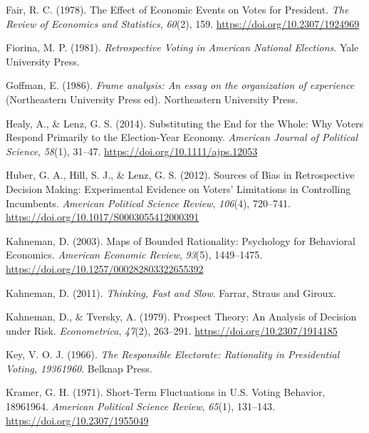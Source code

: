 \documentclass[
]{article}
\newlength{\cslhangindent}
\newlength{\cslentryspacingunit} %
\newenvironment{CSLReferences}[2] %
 {%
  \setlength{\parindent}{0pt}
  \ifodd #1
  \let\oldpar\par
  \def\par{\hangindent=\cslhangindent\oldpar}
  \fi
  \setlength{\parskip}{#2\cslentryspacingunit}
 }%
 {}
\begin{document}
\begin{CSLReferences}{1}{0}
\leavevmode{}%
Fair, R. C. (1978). The {Effect} of {Economic Events} on {Votes} for
{President}. \emph{The Review of Economics and Statistics},
\emph{60}(2), 159. \url{https://doi.org/10.2307/1924969}

\leavevmode{}%
Fiorina, M. P. (1981). \emph{Retrospective {Voting} in {American
National Elections}}. {Yale University Press}.

\leavevmode{}%
Goffman, E. (1986). \emph{Frame analysis: An essay on the organization
of experience} (Northeastern University Press ed). {Northeastern
University Press}.

\leavevmode{}%
Healy, A., \& Lenz, G. S. (2014). Substituting the {End} for the
{Whole}: {Why Voters Respond Primarily} to the {Election-Year Economy}.
\emph{American Journal of Political Science}, \emph{58}(1), 31--47.
\url{https://doi.org/10.1111/ajps.12053}

\leavevmode{}%
Huber, G. A., Hill, S. J., \& Lenz, G. S. (2012). Sources of {Bias} in
{Retrospective Decision Making}: {Experimental Evidence} on {Voters}'
{Limitations} in {Controlling Incumbents}. \emph{American Political
Science Review}, \emph{106}(4), 720--741.
\url{https://doi.org/10.1017/S0003055412000391}

\leavevmode{}%
Kahneman, D. (2003). Maps of {Bounded Rationality}: {Psychology} for
{Behavioral Economics}. \emph{American Economic Review}, \emph{93}(5),
1449--1475. \url{https://doi.org/10.1257/000282803322655392}

\leavevmode{}%
Kahneman, D. (2011). \emph{Thinking, {Fast} and {Slow}}. {Farrar, Straus
and Giroux}.

\leavevmode{}%
Kahneman, D., \& Tversky, A. (1979). Prospect {Theory}: {An Analysis} of
{Decision} under {Risk}. \emph{Econometrica}, \emph{47}(2), 263--291.
\url{https://doi.org/10.2307/1914185}

\leavevmode{}%
Key, V. O. J. (1966). \emph{The {Responsible Electorate}: {Rationality}
in {Presidential Voting}, 1936{\textendash}1960}. {Belknap Press}.

\leavevmode{}%
Kramer, G. H. (1971). Short-{Term Fluctuations} in {U}.{S}. {Voting
Behavior}, 1896{\textendash}1964. \emph{American Political Science
Review}, \emph{65}(1), 131--143. \url{https://doi.org/10.2307/1955049}


\end{CSLReferences}
\end{document}
